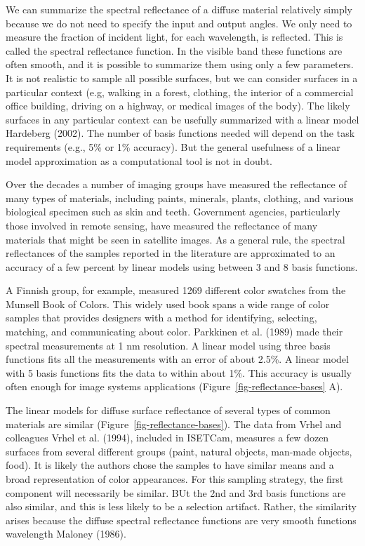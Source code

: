 \documentclass[
  letterpaper,
]{book}
\begin{document}
We can summarize the spectral reflectance of a diffuse material
relatively simply because we do not need to specify the input and output
angles. We only need to measure the fraction of incident light, for each
wavelength, is reflected. This is called the spectral reflectance
function. In the visible band these functions are often smooth, and it
is possible to summarize them using only a few parameters. It is not
realistic to sample all possible surfaces, but we can consider surfaces
in a particular context (e.g, walking in a forest, clothing, the
interior of a commercial office building, driving on a highway, or
medical images of the body). The likely surfaces in any particular
context can be usefully summarized with a linear model Hardeberg (2002).
The number of basis functions needed will depend on the task
requirements (e.g., 5\% or 1\% accuracy). But the general usefulness of
a linear model approximation as a computational tool is not in doubt.

Over the decades a number of imaging groups have measured the
reflectance of many types of materials, including paints, minerals,
plants, clothing, and various biological specimen such as skin and
teeth. Government agencies, particularly those involved in remote
sensing, have measured the reflectance of many materials that might be
seen in satellite images. As a general rule, the spectral reflectances
of the samples reported in the literature are approximated to an
accuracy of a few percent by linear models using between 3 and 8 basis
functions.

A Finnish group, for example, measured 1269 different color swatches
from the Munsell Book of Colors. This widely used book spans a wide
range of color samples that provides designers with a method for
identifying, selecting, matching, and communicating about color.
Parkkinen et al. (1989) made their spectral measurements at 1 nm
resolution. A linear model using three basis functions fits all the
measurements with an error of about 2.5\%. A linear model with 5 basis
functions fits the data to within about 1\%. This accuracy is usually
often enough for image systems applications
(Figure~\ref{fig-reflectance-bases} A).

The linear models for diffuse surface reflectance of several types of
common materials are similar (Figure~\ref{fig-reflectance-bases}). The
data from Vrhel and colleagues Vrhel et al. (1994), included in ISETCam,
measures a few dozen surfaces from several different groups (paint,
natural objects, man-made objects, food). It is likely the authors chose
the samples to have similar means and a broad representation of color
appearances. For this sampling strategy, the first component will
necessarily be similar. BUt the 2nd and 3rd basis functions are also
similar, and this is less likely to be a selection artifact. Rather, the
similarity arises because the diffuse spectral reflectance functions are
very smooth functions wavelength Maloney (1986).
\end{document}
